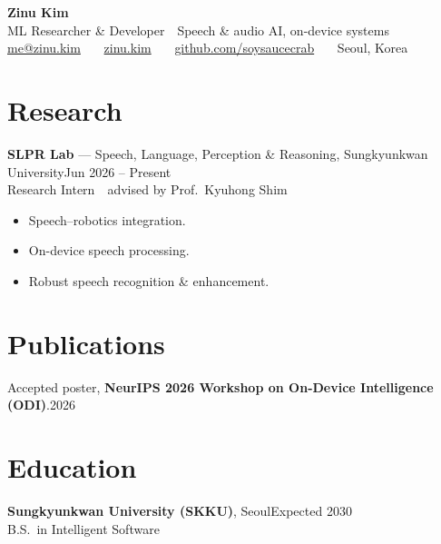 \documentclass[10pt,a4paper]{article}
\begin{document}
\color{ink}

{\fontsize{26}{30}\selectfont\bfseries Zinu Kim}\\[3pt]
{\color{muted}ML Researcher \& Developer \,\textbullet\, Speech \& audio AI, on-device systems}\\[5pt]
{\small
\href{mailto:me@zinu.kim}{me@zinu.kim} \ \textbullet\ \
\href{https://zinu.kim}{zinu.kim} \ \textbullet\ \
\href{https://github.com/soysaucecrab}{github.com/soysaucecrab} \ \textbullet\ \
Seoul, Korea}

\section{Research}
\textbf{SLPR Lab} — Speech, Language, Perception \& Reasoning, Sungkyunkwan University\hfill{\color{muted}Jun 2026 -- Present}\\[1pt]
{\color{muted}Research Intern \,\textbullet\, advised by Prof.\ Kyuhong Shim}
\begin{itemize}[leftmargin=1.1em,itemsep=1pt,topsep=4pt]
  \item Speech--robotics integration.
  \item On-device speech processing.
  \item Robust speech recognition \& enhancement.
\end{itemize}

\section{Publications}
Accepted poster, \textbf{NeurIPS 2026 Workshop on On-Device Intelligence (ODI)}.\hfill{\color{muted}2026}

\section{Education}
\textbf{Sungkyunkwan University (SKKU)}, Seoul\hfill{\color{muted}Expected 2030}\\[1pt]
{\color{muted}B.S.\ in Intelligent Software}

\end{document}
